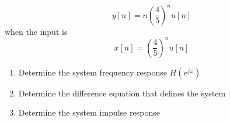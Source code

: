 \documentclass{article}
\begin{document}
\begin{enumerate}
\begin{equation}
        y[n] = n\left(\frac{4}{5}\right)^nu[n]
    \end{equation}
    when the input is
    \begin{equation}
        x[n] = \left(\frac{4}{5}\right)^nu[n]
    \end{equation}
    \begin{enumerate}
        \item Determine the system frequency response $H(e^{j\omega})$
        \item Determine the difference equation that defines the system
        \item Determine the system impulse response
    \end{enumerate}
\end{enumerate}
\end{document}
